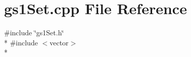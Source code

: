 \section{gs1\+Set.\+cpp File Reference}
\label{gs1_set_8cpp}
{\ttfamily \#include \char`\"{}gs1\+Set.\+h\char`\"{}}\\*
{\ttfamily \#include $<$vector$>$}\\*
